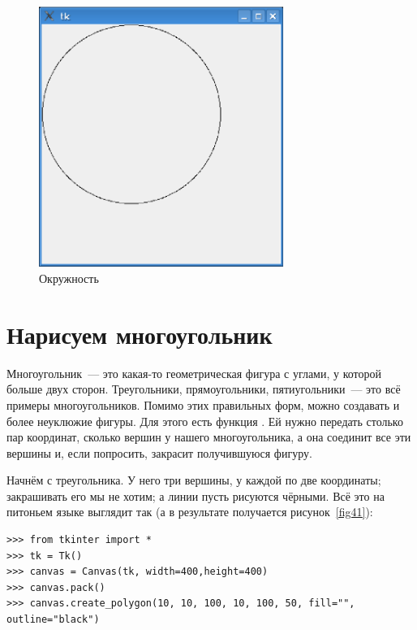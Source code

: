 \begin{figure}
\begin{center}
\includegraphics[width=80mm]{../en/figure40.eps}
\end{center}
\caption{Окружность}\label{fig40}
\end{figure}

\section{Нарисуем многоугольник}

Многоугольник — это какая-то геометрическая фигура с углами, у которой больше двух сторон. Треугольники, прямоугольники, пятиугольники — это всё примеры многоугольников. Помимо этих правильных форм, можно создавать и более неуклюжие фигуры. Для этого есть функция . Ей нужно передать столько пар координат, сколько вершин у нашего многоугольника, а она соединит все эти вершины и, если попросить, закрасит получившуюся фигуру.

Начнём с треугольника. У него три вершины, у каждой по две координаты; закрашивать его мы не хотим; а линии пусть рисуются чёрными. Всё это на питоньем языке выглядит так (а в результате получается рисунок \ref{fig41}):

\begin{listing}
\begin{verbatim}
>>> from tkinter import *
>>> tk = Tk()
>>> canvas = Canvas(tk, width=400,height=400)
>>> canvas.pack()
>>> canvas.create_polygon(10, 10, 100, 10, 100, 50, fill="", outline="black")
\end{verbatim}
\end{listing}

